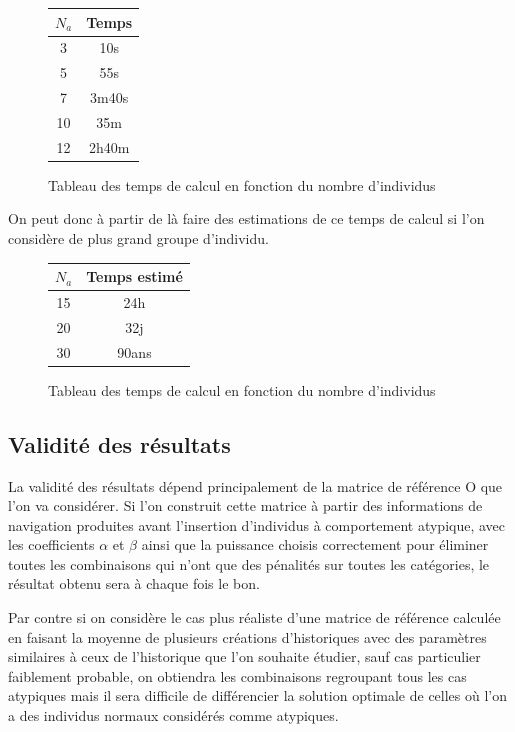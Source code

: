 \documentclass[a4paper, 11pt]{article}
\begin{document}
\begin{figure}[h!]
\center
\begin{tabular}{|c|c|}
\hline
$N_a$ & Temps\\
\hline
3 & 10s\\
\hline
5 & 55s\\
\hline
7 & 3m40s\\
\hline
10 & 35m\\
\hline
12 & 2h40m\\
\hline
\end{tabular}
\caption{Tableau des temps de calcul en fonction du nombre d'individus}
\end{figure}

On peut donc à partir de là faire des estimations de ce temps de calcul si l'on considère de plus grand groupe d'individu.

\begin{figure}[h!]
\center
\begin{tabular}{|c|c|}
\hline
$N_a$ & Temps estimé\\
\hline
15 & 24h\\
\hline
20 & 32j\\
\hline
30 & 90ans\\
\hline
\end{tabular}
\caption{Tableau des temps de calcul en fonction du nombre d'individus}
\end{figure}

\subsection{Validité des résultats}

La validité des résultats dépend principalement de la matrice de référence O que l'on va considérer. Si l'on construit cette matrice à partir des informations de navigation produites avant l'insertion d'individus à comportement atypique, avec les coefficients $\alpha$ et $\beta$ ainsi que la puissance choisis correctement pour éliminer toutes les combinaisons qui n'ont que des pénalités sur toutes les catégories, le résultat obtenu sera à chaque fois le bon. 

Par contre si on considère le cas plus réaliste d'une matrice de référence calculée en faisant la moyenne de plusieurs créations d'historiques avec des paramètres similaires à ceux de l'historique que l'on souhaite étudier, sauf cas particulier faiblement probable, on obtiendra les combinaisons regroupant tous les cas atypiques mais il sera difficile de différencier la solution optimale de celles où l'on a des individus normaux considérés comme atypiques.
\end{document}
